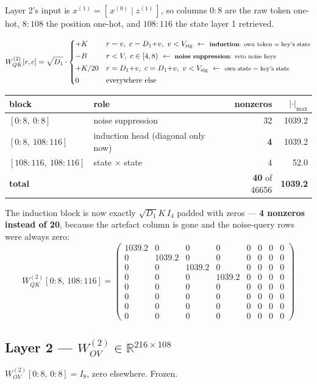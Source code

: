 \documentclass[11pt]{article}
\newcommand{\R}{\mathbb{R}}
\newcommand{\Wqk}{W_{QK}}
\newcommand{\Wov}{W_{OV}}
\newcommand{\rowlab}[1]{\ \leftarrow\ \text{\footnotesize #1}}
\newcommand{\Vsig}{V_{\mathrm{sig}}}
\begin{document}
Layer 2's input is $x^{(1)}=[\,x^{(0)}\mid z^{(1)}\,]$, so columns $0{:}8$ are the raw token
one-hot, $8{:}108$ the position one-hot, and $108{:}116$ the state layer 1 retrieved.

\[
\Wqk^{(2)}[r,c]=\sqrt{D_1}\cdot\begin{cases}
+K & r=v,\ c=D_1{+}v,\ v<\Vsig \rowlab{\textbf{induction}: own token $=$ key's state}\\[2pt]
-B & r<V,\ c\in[4,8) \rowlab{\textbf{noise suppression}: veto noise keys}\\[2pt]
+K/20 & r=D_1{+}v,\ c=D_1{+}v,\ v<\Vsig \rowlab{own state $=$ key's state}\\[2pt]
0 & \text{everywhere else}
\end{cases}
\]

\begin{center}\small
\begin{tabular}{@{}llrr@{}}
\toprule
block & role & nonzeros & $|\cdot|_{\max}$ \\
\midrule
$[0{:}8,\ 0{:}8]$          & noise suppression & 32 & 1039.2 \\
$[0{:}8,\ 108{:}116]$      & induction head (diagonal only now) & \textbf{4} & 1039.2 \\
$[108{:}116,\ 108{:}116]$  & state $\times$ state & 4 & \ \ 52.0 \\
\midrule
\textbf{total} & & \textbf{40} of 46656 & \textbf{1039.2} \\
\bottomrule
\end{tabular}
\end{center}

The induction block is now exactly $\sqrt{D_1}K\,I_4$ padded with zeros --- \textbf{4 nonzeros
instead of 20}, because the artefact column is gone and the noise-query rows were always zero:
\[
\Wqk^{(2)}[0{:}8,\,108{:}116]=
\begin{pmatrix}
1039.2 & 0 & 0 & 0 & 0&0&0&0\\
0 & 1039.2 & 0 & 0 & 0&0&0&0\\
0 & 0 & 1039.2 & 0 & 0&0&0&0\\
0 & 0 & 0 & 1039.2 & 0&0&0&0\\
0&0&0&0&0&0&0&0\\ 0&0&0&0&0&0&0&0\\ 0&0&0&0&0&0&0&0\\ 0&0&0&0&0&0&0&0
\end{pmatrix}
\]

\subsection{Layer 2 --- $\Wov^{(2)}\in\R^{216\times108}$}
$\Wov^{(2)}[0{:}8,\,0{:}8]=I_8$, zero elsewhere. Frozen.
\end{document}
